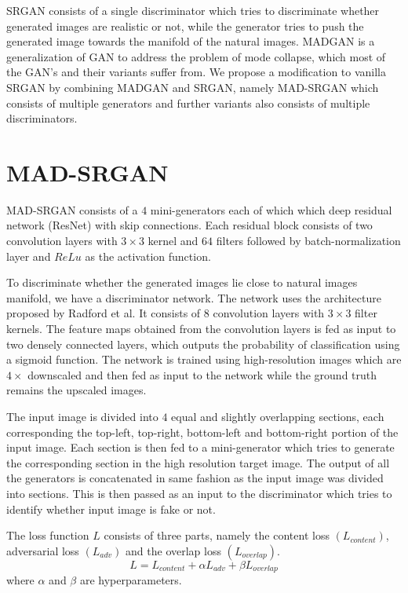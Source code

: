 \documentclass[12pt,a4paper,twocolumn]{article}
\begin{document}
        SRGAN consists of a single discriminator which tries to discriminate whether generated images are realistic or not, while the generator tries to push the generated image towards the manifold of the natural images.
        MADGAN \cite{madgan} is a generalization of GAN to address the problem of mode collapse, which most of the GAN's and their variants suffer from.
        We propose a modification to vanilla SRGAN by combining MADGAN and SRGAN, namely MAD-SRGAN which consists of multiple generators and further variants also consists of multiple discriminators.

    \section{MAD-SRGAN}
        MAD-SRGAN consists of a $4$ mini-generators each of which which deep residual network (ResNet) with skip connections.
        Each residual block consists of  two convolution layers with $3\times3$ kernel and $64$ filters followed by batch-normalization layer and $ReLu$ as the activation function.

        To discriminate whether the generated images lie close to natural images manifold, we have a discriminator network.
        The network uses the architecture proposed by Radford et al.
        It consists of $8$ convolution layers with $3\times3$ filter kernels.
        The feature maps obtained from the convolution layers is fed as input to two densely connected layers, which outputs the probability of classification using a sigmoid function.
        The network is trained using high-resolution images which are $4\times$ downscaled and then fed as input to the network while the ground truth remains the upscaled images.

        The input image is divided into $4$ equal and slightly overlapping sections, each corresponding the top-left, top-right, bottom-left and bottom-right portion of the input image.
        Each section is then fed to a mini-generator which tries to generate the corresponding section in the high resolution target image.
        The output of all the generators is concatenated in same fashion as the input image was divided into sections.
        This is then passed as an input to the discriminator which tries to identify whether input image is fake or not.

        The loss function $L$ consists of three parts, namely the content loss $(L_{content})$, adversarial loss $(L_{adv})$ and the overlap loss $(L_{overlap})$.\\
        $$L = L_{content} + \alpha L_{adv} + \beta L_{overlap}$$ where $\alpha$ and $\beta$ are hyperparameters.
\end{document}
